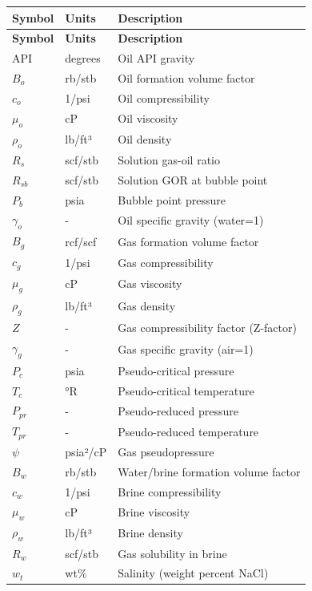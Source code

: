 \documentclass[11pt,a4paper]{article}
\begin{document}
\begin{longtable}{llp{8cm}}
\toprule
\textbf{Symbol} & \textbf{Units} & \textbf{Description} \\
\midrule
\endfirsthead
\toprule
\textbf{Symbol} & \textbf{Units} & \textbf{Description} \\
\midrule
\endhead

$\text{API}$ & degrees & Oil API gravity \\
$B_o$ & rb/stb & Oil formation volume factor \\
$c_o$ & 1/psi & Oil compressibility \\
$\mu_o$ & cP & Oil viscosity \\
$\rho_o$ & lb/ft³ & Oil density \\
$R_s$ & scf/stb & Solution gas-oil ratio \\
$R_{sb}$ & scf/stb & Solution GOR at bubble point \\
$P_b$ & psia & Bubble point pressure \\
$\gamma_o$ & - & Oil specific gravity (water=1) \\

$B_g$ & rcf/scf & Gas formation volume factor \\
$c_g$ & 1/psi & Gas compressibility \\
$\mu_g$ & cP & Gas viscosity \\
$\rho_g$ & lb/ft³ & Gas density \\
$Z$ & - & Gas compressibility factor (Z-factor) \\
$\gamma_g$ & - & Gas specific gravity (air=1) \\
$P_c$ & psia & Pseudo-critical pressure \\
$T_c$ & °R & Pseudo-critical temperature \\
$P_{pr}$ & - & Pseudo-reduced pressure \\
$T_{pr}$ & - & Pseudo-reduced temperature \\
$\psi$ & psia²/cP & Gas pseudopressure \\

$B_w$ & rb/stb & Water/brine formation volume factor \\
$c_w$ & 1/psi & Brine compressibility \\
$\mu_w$ & cP & Brine viscosity \\
$\rho_w$ & lb/ft³ & Brine density \\
$R_w$ & scf/stb & Gas solubility in brine \\
$w_t$ & wt\% & Salinity (weight percent NaCl) \\


\end{longtable}
\end{document}
